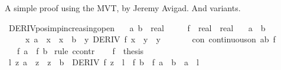 \begin{isabellebody}
\isadelimproof
%
\endisadelimproof
%
\isadelimdocument
%
\endisadelimdocument
%
\isatagdocument
%
\isamarkuptrue%
%
\endisatagdocument
{\isafolddocument}%
%
\isadelimdocument
%
\endisadelimdocument
%
\begin{isamarkuptext}%
A simple proof using the MVT, by Jeremy Avigad. And variants.%
\end{isamarkuptext}\isamarkuptrue%
\isamarkupfalse%
\ DERIV{\isacharunderscore}{\kern0pt}pos{\isacharunderscore}{\kern0pt}imp{\isacharunderscore}{\kern0pt}increasing{\isacharunderscore}{\kern0pt}open{\isacharcolon}{\kern0pt}\isanewline
\ \ \ a\ b\ {\isacharcolon}{\kern0pt}{\isacharcolon}{\kern0pt}\ real\isanewline
\ \ \ \ \ f\ {\isacharcolon}{\kern0pt}{\isacharcolon}{\kern0pt}\ {\isachardoublequoteopen}real\ {\isasymRightarrow}\ real{\isachardoublequoteclose}\isanewline
\ \ \ {\isachardoublequoteopen}a\ {\isacharless}{\kern0pt}\ b{\isachardoublequoteclose}\isanewline
\ \ \ \ \ {\isachardoublequoteopen}{\isasymAnd}x{\isachardot}{\kern0pt}\ a\ {\isacharless}{\kern0pt}\ x\ {\isasymLongrightarrow}\ x\ {\isacharless}{\kern0pt}\ b\ {\isasymLongrightarrow}\ {\isacharparenleft}{\kern0pt}{\isasymexists}y{\isachardot}{\kern0pt}\ DERIV\ f\ x\ {\isacharcolon}{\kern0pt}{\isachargreater}{\kern0pt}\ y\ {\isasymand}\ y\ {\isachargreater}{\kern0pt}\ {}{\isacharparenright}{\kern0pt}{\isachardoublequoteclose}\isanewline
\ \ \ \ \ con{\isacharcolon}{\kern0pt}\ {\isachardoublequoteopen}continuous{\isacharunderscore}{\kern0pt}on\ {\isacharbraceleft}{\kern0pt}a{\isachardot}{\kern0pt}{\isachardot}{\kern0pt}b{\isacharbraceright}{\kern0pt}\ f{\isachardoublequoteclose}\isanewline
\ \ \ {\isachardoublequoteopen}f\ a\ {\isacharless}{\kern0pt}\ f\ b{\isachardoublequoteclose}\isanewline
%
\isadelimproof
%
\endisadelimproof
%
\isatagproof
{}\isamarkupfalse%
\ {\isacharparenleft}{\kern0pt}rule\ ccontr{\isacharparenright}{\kern0pt}\isanewline
\ \ \isamarkupfalse%
\ f{\isacharcolon}{\kern0pt}\ {\isachardoublequoteopen}{\isasymnot}\ {\isacharquery}{\kern0pt}thesis{\isachardoublequoteclose}\isanewline
\ \ \isamarkupfalse%
\ {\isachardoublequoteopen}{\isasymexists}l\ z{\isachardot}{\kern0pt}\ a\ {\isacharless}{\kern0pt}\ z\ {\isasymand}\ z\ {\isacharless}{\kern0pt}\ b\ {\isasymand}\ DERIV\ f\ z\ {\isacharcolon}{\kern0pt}{\isachargreater}{\kern0pt}\ l\ {\isasymand}\ f\ b\ {\isacharminus}{\kern0pt}\ f\ a\ {\isacharequal}{\kern0pt}\ {\isacharparenleft}{\kern0pt}b\ {\isacharminus}{\kern0pt}\ a{\isacharparenright}{\kern0pt}\ {\isacharasterisk}{\kern0pt}\ l{\isachardoublequoteclose}\isanewline

\end{isabellebody}
